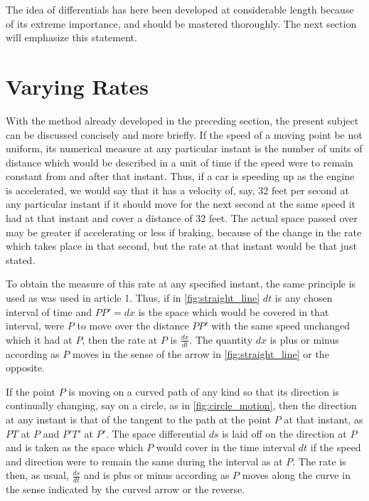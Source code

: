The idea of differentials has here been developed at considerable length because of its extreme importance, and should be mastered thoroughly. The next section will emphasize this statement.

\section{Varying Rates}
With the method already developed in the preceding section, the present subject can be discussed concisely and more briefly. If the speed of a moving point be not uniform, its numerical measure at any particular instant is the number of units of distance which would be described in a unit of time if the speed were to remain constant from and after that instant. Thus, if a car is speeding up as the engine is accelerated, we would say that it has a velocity of, say, 32 feet per second at any particular instant if it should move for the next second at the same speed it had at that instant and cover a distance of 32 feet. The actual space passed over may be greater if accelerating or less if braking, because of the change in the rate which takes place in that second, but the rate at that instant would be that just stated.

To obtain the measure of this rate at any specified instant, the same principle is used as was used in article 1. Thus, if in \autoref{fig:straight_line} $dt$ is any chosen interval of time and $PP' = dx$ is the space which would be covered in that interval, were $P$ to move over the distance $PP'$ with the same speed unchanged which it had at $P$, then the rate at $P$ is $\frac{dx}{dt}$. The quantity $dx$ is plus or minus according as $P$ moves in the sense of the arrow in \autoref{fig:straight_line} or the opposite.

If the point $P$ is moving on a curved path of any kind so that its direction is continually changing, say on a circle, as in \autoref{fig:circle_motion}, then the direction at any instant is that of the tangent to the path at the point $P$ at that instant, as $PT$ at $P$ and $P'T'$ at $P'$. The space differential $ds$ is laid off on the direction at $P$ and is taken as the space which $P$ would cover in the time interval $dt$ if the speed and direction were to remain the same during the interval as at $P$. The rate is then, as usual, $\frac{ds}{dt}$ and is plus or minus according as $P$ moves along the curve in the sense indicated by the curved arrow or the reverse.

